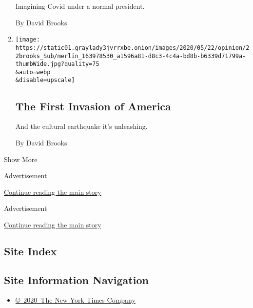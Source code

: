 \begin{enumerate}
  Imagining Covid under a normal president.

  By David Brooks
\item
  \href{/2020/05/21/opinion/us-coronavirus-history.html}{}

  \texttt{[image: https://static01.graylady3jvrrxbe.onion/images/2020/05/22/opinion/22brooks\_Sub/merlin\_163978530\_a1596a81-d8c3-4c4a-bd8b-b6339d71799a-thumbWide.jpg?quality=75\\\&auto=webp\\\&disable=upscale]}

  \hypertarget{the-first-invasion-of-america}{%
  \subsection{The First Invasion of
  America}\label{the-first-invasion-of-america}}

  And the cultural earthquake it's unleashing.

  By David Brooks
\end{enumerate}

Show More

Advertisement

\protect\hyperlink{after-mid1}{Continue reading the main story}

Advertisement

\protect\hyperlink{after-mktg}{Continue reading the main story}

\hypertarget{site-index}{%
\subsection{Site Index}\label{site-index}}

\hypertarget{site-information-navigation}{%
\subsection{Site Information
Navigation}\label{site-information-navigation}}

\begin{itemize}
\tightlist
\item
  \href{https://help.nytimes3xbfgragh.onion/hc/en-us/articles/115014792127-Copyright-notice}{©~2020~The
  New York Times Company}
\end{itemize}

